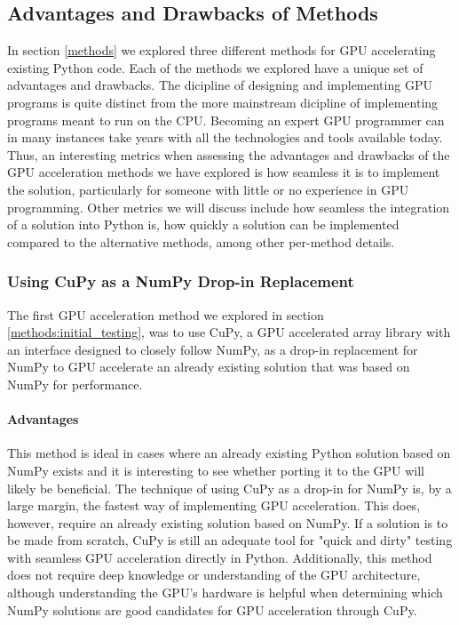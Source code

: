 \subsection{Advantages and Drawbacks of Methods} \label{discussion:advantages_and_drawbacks_of_methods}
In section \ref{methods} we explored three different methods for GPU accelerating existing Python code.
Each of the methods we explored have a unique set of advantages and drawbacks.
The dicipline of designing and implementing GPU programs is quite distinct from the more mainstream dicipline of implementing programs meant to run on the CPU.
Becoming an expert GPU programmer can in many instances take years with all the technologies and tools available today.
Thus, an interesting metrics when assessing the advantages and drawbacks of the GPU acceleration methods we have explored is how seamless it is to implement the solution, particularly for someone with little or no experience in GPU programming.
Other metrics we will discuss include how seamless the integration of a solution into Python is, how quickly a solution can be implemented compared to the alternative methods, among other per-method details.

\subsubsection{Using CuPy as a NumPy Drop-in Replacement} \label{discussion:using_cupy_as_a_numpy_drop_in_replacement}
The first GPU acceleration method we explored in section \ref{methods:initial_testing}, was to use CuPy, a GPU accelerated array library with an interface designed to closely follow NumPy, as a drop-in replacement for NumPy to GPU accelerate an already existing solution that was based on NumPy for performance.

\paragraph{Advantages}
This method is ideal in cases where an already existing Python solution based on NumPy exists and it is interesting to see whether porting it to the GPU will likely be beneficial.
The technique of using CuPy as a drop-in for NumPy is, by a large margin, the fastest way of implementing GPU acceleration.
This does, however, require an already existing solution based on NumPy.
If a solution is to be made from scratch, CuPy is still an adequate tool for "quick and dirty" testing with seamless GPU acceleration directly in Python.
Additionally, this method does not require deep knowledge or understanding of the GPU architecture, although understanding the GPU's hardware is helpful when determining which NumPy solutions are good candidates for GPU acceleration through CuPy.

